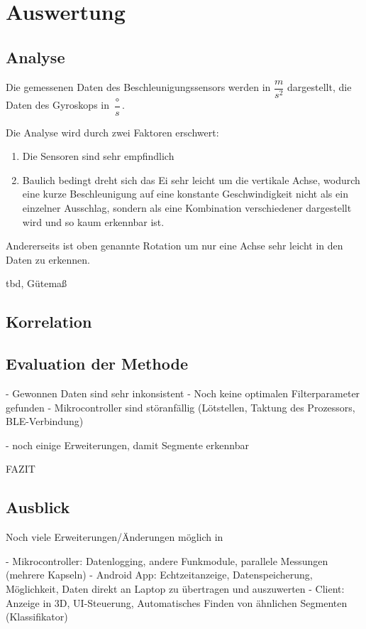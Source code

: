 \section{Auswertung}
\subsection{Analyse}
Die gemessenen Daten des Beschleunigungssensors werden in $\dfrac{m}{s^{2}}$ 
dargestellt, die Daten des Gyroskops in $\dfrac{\circ}{s}$.

Die Analyse wird durch zwei Faktoren erschwert:
\begin{enumerate}
	\item Die Sensoren sind sehr empfindlich
	\item Baulich bedingt dreht sich das Ei sehr leicht um die vertikale Achse, wodurch eine kurze Beschleunigung auf eine konstante Geschwindigkeit nicht als ein einzelner Ausschlag, sondern als eine Kombination verschiedener dargestellt wird und so kaum erkennbar ist.
\end{enumerate}
Andererseits ist oben genannte Rotation um nur eine Achse sehr leicht in den Daten zu erkennen.

tbd,  Gütemaß

\subsection{Korrelation}


\subsection{Evaluation der Methode}
 
- Gewonnen Daten sind sehr inkonsistent
- Noch keine optimalen Filterparameter gefunden
- Mikrocontroller sind störanfällig (Lötstellen, Taktung des Prozessors, BLE-Verbindung)

- noch einige Erweiterungen, damit Segmente erkennbar

FAZIT

\subsection{Ausblick}

Noch viele Erweiterungen/Änderungen möglich in

- Mikrocontroller: Datenlogging, andere Funkmodule, parallele Messungen (mehrere Kapseln)
- Android App: Echtzeitanzeige, Datenspeicherung, Möglichkeit, Daten direkt an Laptop zu übertragen und auszuwerten
- Client: Anzeige in 3D, UI-Steuerung, Automatisches Finden von ähnlichen Segmenten (Klassifikator)

